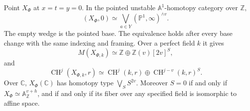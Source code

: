 \begin{theorem}\label{thm:motivic}
Point $X_\Phi$ at $x=t=y=0$. In the pointed unstable $\mathbb A^1$-homotopy category over $\mathbb Z$,
\[
 (X_\Phi,0)\simeq\bigvee_{a\in Y}(\mathbb P^1,\infty)^{\wedge v}.
\]
The empty wedge is the pointed base. The equivalence holds after every base change with the same indexing and framing. Over a perfect field $k$ it gives
\[
 M(X_{\Phi,k})\simeq\mathbb Z\oplus\mathbb Z(v)[2v]^S,
\]
and
\[
 \operatorname{CH}^j(X_{\Phi,k},r)
 \simeq\operatorname{CH}^j(k,r)
       \oplus\operatorname{CH}^{j-v}(k,r)^S.
\]
Over $\mathbb C$, $X_\Phi(\mathbb C)$ has homotopy type $\bigvee_S S^{2v}$. Moreover $S=0$ if and only if $X_\Phi\simeq\mathbb A^{v+h}_{\mathbb Z}$, and if and only if its fiber over any specified field is isomorphic to affine space.
\end{theorem}
